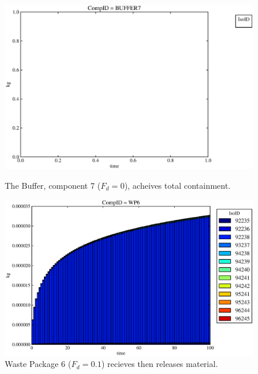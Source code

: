 \begin{figure}[ht]
\begin{minipage}[b]{0.45\linewidth}
  \includegraphics[width=\textwidth]{./chapters/demonstration/base/lpEMII3.eps}
  \caption[Case LPEMII Buffer Contaminants]{
    The Buffer, component 7 ($F_d=0$), acheives total containment.
    }
  \label{fig:lpEMIIbuff}

\end{minipage}
\hspace{0.05\linewidth}
\begin{minipage}[b]{0.45\linewidth}
  \includegraphics[width=\textwidth]{./chapters/demonstration/base/lpEMII2.eps}
  \caption[Case LPEMII Waste Package Contaminants.]{ 
    Waste Package 6 ($F_d = 0.1$) recieves then releases material. 
    }
  \label{fig:lpEMIIwp6}


\end{minipage}
\end{figure}
